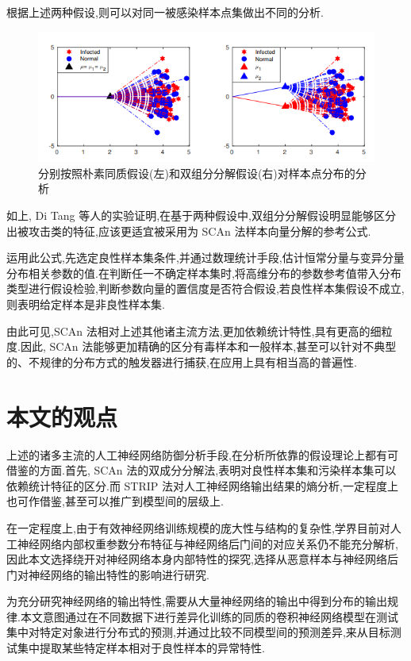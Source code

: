 根据上述两种假设,则可以对同一被感染样本点集做出不同的分析.
\begin{figure}[H]
	\centering
	\includegraphics[scale=0.85]{Figures/SCAn1.png}
	\caption{分别按照朴素同质假设(左)和双组分分解假设(右)对样本点分布的分析}
\end{figure}

如上, Di Tang 等人的实验证明,在基于两种假设中,双组分分解假设明显能够区分出被攻击类的特征,应该更适宜被采用为 SCAn 法样本向量分解的参考公式.

运用此公式,先选定良性样本集条件,并通过数理统计手段,估计恒常分量与变异分量分布相关参数的值.在判断任一不确定样本集时,将高维分布的参数参考值带入分布类型进行假设检验,判断参数向量的置信度是否符合假设,若良性样本集假设不成立,则表明给定样本是非良性样本集.

由此可见,SCAn 法相对上述其他诸主流方法,更加依赖统计特性,具有更高的细粒度.因此, SCAn 法能够更加精确的区分有毒样本和一般样本,甚至可以针对不典型的、不规律的分布方式的触发器进行捕获,在应用上具有相当高的普遍性.

\section{本文的观点}

上述的诸多主流的人工神经网络防御分析手段,在分析所依靠的假设理论上都有可借鉴的方面.首先, SCAn 法的双成分分解法,表明对良性样本集和污染样本集可以依赖统计特征的区分.而 STRIP 法对人工神经网络输出结果的熵分析,一定程度上也可作借鉴,甚至可以推广到模型间的层级上.

在一定程度上,由于有效神经网络训练规模的庞大性与结构的复杂性,学界目前对人工神经网络内部权重参数分布特征与神经网络后门间的对应关系仍不能充分解析,因此本文选择绕开对神经网络本身内部特性的探究,选择从恶意样本与神经网络后门对神经网络的输出特性的影响进行研究.

为充分研究神经网络的输出特性,需要从大量神经网络的输出中得到分布的输出规律.本文意图通过在不同数据下进行差异化训练的同质的卷积神经网络模型在测试集中对特定对象进行分布式的预测,并通过比较不同模型间的预测差异,来从目标测试集中提取某些特定样本相对于良性样本的异常特性.


